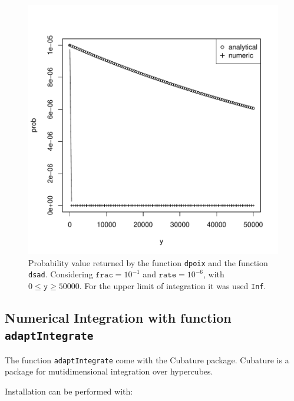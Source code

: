 \documentclass{article}
\newcommand{\code}[1]{\texttt{#1}}
\begin{document}
\begin{figure}[ht]
  \begin{center}
\includegraphics{sads_tutorial-018}
\end{center}
\caption{Probability value returned by the function \code{dpoix} and the function \code{dsad}. Considering $\code{frac}=10^{-1}$ and $\code{rate}=10^{-6}$, with $0 \leq \code{y} \geq 50000$. For the upper limit of integration it was used \code{Inf}.}
\label{fig:distrExIntegrate}
\end{figure}


\subsection*{Numerical Integration with function \code{adaptIntegrate}}

The function \code{adaptIntegrate} come with the Cubature package. Cubature is a package for mutidimensional integration over hypercubes.

Installation can be performed with:
\end{document}
